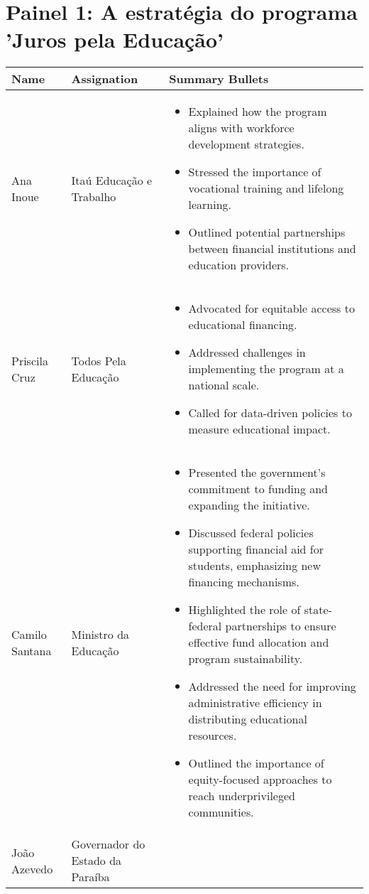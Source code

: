 \documentclass[a4paper,10pt]{article}
\begin{document}
\section*{Painel 1: A estratégia do programa 'Juros pela Educação'}

\begin{table}[htbp!]
\centering
\renewcommand{\arraystretch}{1.2}
\begin{tabular}{|p{1in}|p{1.4in}|p{4in}|}
\hline
Name & Assignation & Summary Bullets \\
\hline
Ana Inoue & Itaú Educação e Trabalho & \begin{itemize}
\item Explained how the program aligns with workforce development strategies.
\item Stressed the importance of vocational training and lifelong learning.
\item Outlined potential partnerships between financial institutions and education providers.
\end{itemize}\\
\hline
Priscila Cruz & Todos Pela Educação & \begin{itemize}
\item Advocated for equitable access to educational financing.
\item Addressed challenges in implementing the program at a national scale.
\item Called for data-driven policies to measure educational impact.
\end{itemize}\\
\hline
Camilo Santana & Ministro da Educação & \begin{itemize}
\item Presented the government’s commitment to funding and expanding the initiative.
\item Discussed federal policies supporting financial aid for students, emphasizing new financing mechanisms.
\item Highlighted the role of state-federal partnerships to ensure effective fund allocation and program sustainability.
\item Addressed the need for improving administrative efficiency in distributing educational resources.
\item Outlined the importance of equity-focused approaches to reach underprivileged communities.
\end{itemize}\\
\hline
João Azevedo & Governador do Estado da Paraíba & \begin{itemize}

\end{itemize}
\end{tabular}
\end{table}
\end{document}
